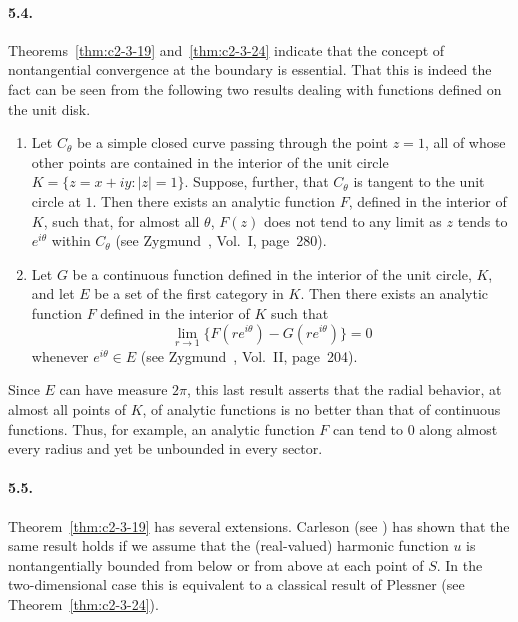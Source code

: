 \paragraph{5.4.} Theorems~\ref{thm:c2-3-19} and~\ref{thm:c2-3-24} indicate that the concept of nontangential convergence at the boundary is essential. That this is indeed the fact can be seen from the following two results dealing with functions defined on the unit disk.

\begin{enumerate}
\item[(i)] Let $C_\theta$ be a simple closed curve passing through the point $z = 1$, all of whose other points are contained in the interior of the unit circle $K = \{z = x + iy : |z| = 1\}$. Suppose, further, that $C_\theta$ is tangent to the unit circle at $1$. Then there exists an analytic function $F$, defined in the interior of $K$, such that, for almost all $\theta$, $F(z)$ does not tend to any limit as $z$ tends to $e^{i\theta}$ within $C_\theta$ (see Zygmund~\cite{Zygmund1}, Vol.~I, page~280).
\item[(ii)] Let $G$ be a continuous function defined in the interior of the unit circle, $K$, and let $E$ be a set of the first category in $K$. Then there exists an analytic function $F$ defined in the interior of $K$ such that
\[
\lim_{r \to 1} \{F(re^{i\theta}) - G(re^{i\theta})\} = 0
\]
whenever $e^{i\theta} \in E$ (see Zygmund~\cite{Zygmund1}, Vol.~II, page~204).
\end{enumerate}
Since $E$ can have measure $2\pi$, this last result asserts that the radial behavior, at almost all points of $K$, of analytic functions is no better than that of continuous functions. Thus, for example, an analytic function $F$ can tend to 0 along almost every radius and yet be unbounded in every sector.

\paragraph{5.5.} Theorem~\ref{thm:c2-3-19} has several extensions. Carleson (see \cite{Carleson1}) has shown that the same result holds if we assume that the (real-valued) harmonic function $u$ is nontangentially bounded from below or from above at each point of $S$. In the two-dimensional case this is equivalent to a classical result of Plessner (see Theorem~\ref{thm:c2-3-24}).

